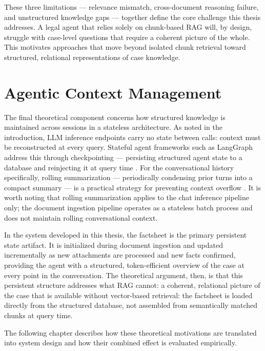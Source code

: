 These three limitations --- relevance mismatch, cross-document reasoning failure, and
unstructured knowledge gaps --- together define the core challenge this thesis addresses.
A legal agent that relies solely on chunk-based RAG will, by design, struggle with
case-level questions that require a coherent picture of the whole. This motivates
approaches that move beyond isolated chunk retrieval toward structured, relational
representations of case knowledge.

\section{Agentic Context Management}

The final theoretical component concerns how structured knowledge is maintained across
sessions in a stateless architecture. As noted in the introduction, LLM inference
endpoints carry no state between calls: context must be reconstructed at every query.
Stateful agent frameworks such as LangGraph address this through checkpointing ---
persisting structured agent state to a database and reinjecting it at query time
\cite{langgraph}. For the conversational history specifically, rolling summarization
--- periodically condensing prior turns into a compact summary --- is a practical
strategy for preventing context overflow \cite{microsoft2024semantickernelpython}.
It is worth noting that rolling summarization applies to the chat inference pipeline
only; the document ingestion pipeline operates as a stateless batch process and does
not maintain rolling conversational context.

In the system developed in this thesis, the factsheet is the primary persistent state
artifact. It is initialized during document ingestion and updated incrementally as new
attachments are processed and new facts confirmed, providing the agent with a structured,
token-efficient overview of the case at every point in the conversation. The theoretical
argument, then, is that this persistent structure addresses what RAG cannot: a coherent,
relational picture of the case that is available without vector-based retrieval: the factsheet is loaded directly from the structured database, not assembled from semantically matched chunks at query time.

The following chapter describes how these theoretical motivations are translated into
system design and how their combined effect is evaluated empirically.

